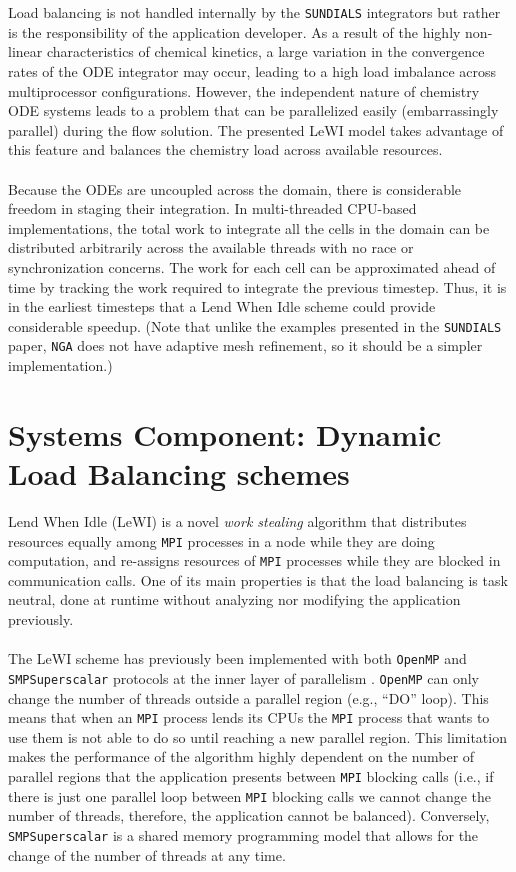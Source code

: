 \documentclass{homework}
\begin{document}
\\ \\ \noindent
Load balancing is not handled internally by the \texttt{SUNDIALS} integrators but rather is the responsibility of the application developer. As a result of the highly non-linear characteristics of chemical kinetics, a large variation in the convergence rates of the ODE integrator may occur, leading to a high load imbalance across multiprocessor configurations. However, the independent nature of chemistry ODE systems leads to a problem that can be parallelized easily (embarrassingly parallel) during the flow solution. The presented LeWI model takes advantage of this feature and balances the chemistry load across available resources.
\\ \\ \noindent
Because the ODEs are uncoupled across the domain, there is considerable freedom in staging their integration. In multi-threaded CPU-based implementations, the total work to integrate all the cells in the domain can be distributed arbitrarily across the available threads with no race or synchronization concerns. The work for each cell can be approximated ahead of time by tracking the work required to integrate the previous timestep. Thus, it is in the earliest timesteps that a Lend When Idle scheme could provide considerable speedup. (Note that unlike the examples \cite{AMReX,PeleC,PeleMP} presented in the \texttt{SUNDIALS} paper, \texttt{NGA} does not have adaptive mesh refinement, so it should be a simpler implementation.)

\section{\textbf{Systems Component: Dynamic Load Balancing schemes}}
\noindent Lend When Idle \cite{LeWI_ICPP09,GARCIA2014,DLB_OpenMP_SMPS} (LeWI) is a novel \emph{work stealing} \cite{Work_Stealing} algorithm that distributes resources equally among \texttt{MPI} processes in a node while they are doing computation, and re-assigns resources of \texttt{MPI} processes while they are blocked in communication calls. One of its main properties is that the load balancing is task neutral, done at runtime without analyzing nor modifying the application previously.
\\ \\ \noindent
The LeWI scheme has previously been implemented with both \texttt{OpenMP} and \texttt{SMPSuperscalar} protocols at the inner layer of parallelism \cite{DLB_OpenMP_SMPS}. \texttt{OpenMP} can only change the number of threads outside a parallel region (e.g., ``DO'' loop). This means that when an \texttt{MPI} process lends its CPUs the \texttt{MPI} process that wants to use them is not able to do so until reaching a new parallel region. This limitation makes the performance of the algorithm highly dependent on the number of parallel regions that the application presents between \texttt{MPI} blocking calls (i.e., if there is just one parallel loop between \texttt{MPI} blocking calls we cannot change the number of threads, therefore, the application cannot be balanced). Conversely, \texttt{SMPSuperscalar} is a shared memory programming model that allows for the change of the number of threads at any time.
\end{document}

